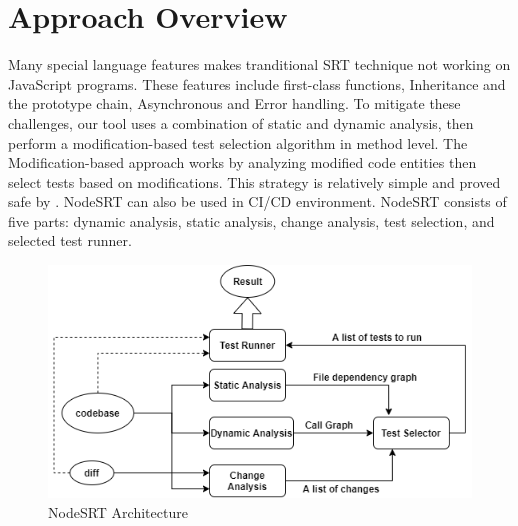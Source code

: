 \documentclass[10pt, conference]{IEEEtran}
\begin{document}
\section{Approach Overview}
 Many special language features makes tranditional SRT technique
not working on JavaScript programs. These features include first-class functions, Inheritance and the prototype chain, Asynchronous and Error handling.
To mitigate these challenges, our tool uses a combination of static and dynamic analysis, then perform a modification-based test 
selection algorithm in method level. The Modification-based approach works by analyzing modified code entities 
then select tests based on modifications. This strategy is relatively simple and proved safe by \cite{b3, b4}. NodeSRT can 
also be used in CI/CD environment. NodeSRT consists of five parts: dynamic analysis, static analysis, change analysis, 
test selection, and selected test runner. 
\begin{figure}[htbp]
    \centerline{\includegraphics[scale=0.45]{NodeSRT Architecture.png}}
    \caption{NodeSRT Architecture}
    \label{fig}
    \end{figure}    
\end{document}
